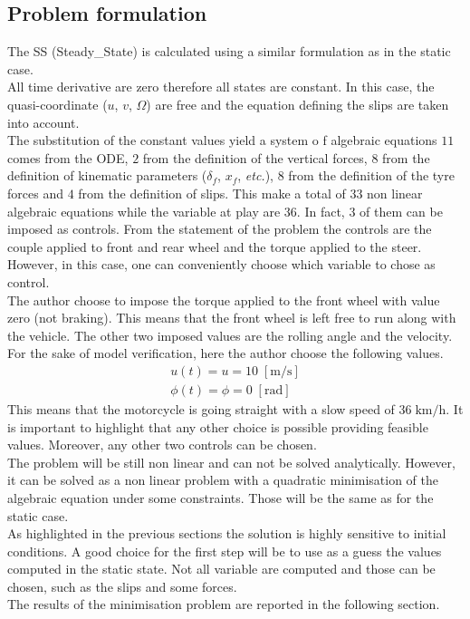 \subsection{Problem formulation}
%
The SS (Steady_State) is calculated using a similar formulation as in the static case.\\
All time derivative are zero therefore all states are constant. In this case, the quasi-coordinate  ($u$, $v$, $\Omega$) are free and the equation defining the slips are taken into account. \\
The substitution of the constant values yield a system o f algebraic equations $11$ comes from the ODE, $2$ from the definition of the vertical forces, $8$ from the definition of kinematic parameters ($\delta_f$, $x_f$, \textit{etc.}), $8$ from the definition of the tyre forces and $4$ from the definition of slips. This make a total of $33$ non linear algebraic equations while the variable at play are $36$. In fact, $3$ of them can be imposed as controls. From the statement of the problem the controls are the couple applied to front and rear wheel and the torque applied to the steer. However, in this case, one can conveniently choose which variable to chose as control.\\
The author choose to impose the torque applied to the front wheel with value zero (not braking). This means that the front wheel is left free to run along with the vehicle. The other two imposed values are the rolling angle and the velocity. For the sake of model verification, here the author choose the following values.
%
\begin{equation}
    \begin{array}{l}
        u(t) = u = 10 \; [\si{\metre/\second}]\\
        \phi(t) = \phi = 0 \; [\si{\radian}]
    \end{array}
\end{equation}
%
This means that the motorcycle is going straight with a slow speed of $36\;\si{\kilo\metre/\hour}$. 
It is important to highlight that any other choice is possible providing feasible values. Moreover, any other two controls can be chosen.\\
The problem will be still non linear and can not be solved analytically. However, it can be solved as a non linear problem with a quadratic minimisation of the algebraic equation under some constraints. Those will be the same as for the static case.\\
As highlighted in the previous sections the solution is highly sensitive to initial conditions. A good choice for the first step will be to use as a guess the values computed in the static state. Not all variable are computed and those can be chosen, such as the slips and some forces.\\
The results of the minimisation problem are reported in the following section.
%
